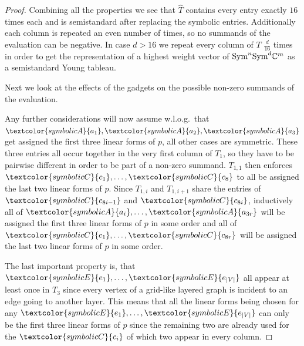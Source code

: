 \documentclass[10pt,a4paper]{article}
\numberwithin{equation}{section}
\theoremstyle{definition}
\newcommand{\Sym}{\textup{Sym}}
\newcommand{\IC}{\mathbb{C}}
\begin{document}
\begin{proof}
    Combining all the properties we see that $\hat{T}$ contains every entry exactly $16$ times each and is semistandard after replacing the symbolic entries.
    Additionally each column is repeated an even number of times, so no summands of the evaluation can be negative.
    In case $d > 16$ we repeat every column of $T$ $\frac{d}{16}$ times in order to get the representation of a highest weight vector of $\Sym^n\Sym^d \IC^m$ as a semistandard Young tableau.
    
    Next we look at the effects of the gadgets on the possible non-zero summands of the evaluation.
    
    Any further considerations will now assume w.l.o.g.\ that $\textcolor{symbolicA}{a_1}, \textcolor{symbolicA}{a_2}, \textcolor{symbolicA}{a_3}$ get assigned the first three linear forms of $p$, all other cases are symmetric.
    These three entries all occur together in the very first column of $T_1$, so they have to be pairwise different in order to be part of a non-zero summand.
    $T_{1,1}$ then enforces $\textcolor{symbolicC}{c_1}, \ldots, \textcolor{symbolicC}{c_8}$ to all be assigned the last two linear forms of $p$.
    Since $T_{1, i}$ and $T_{1, i+1}$ share the entries of $\textcolor{symbolicC}{c_{8i-1}}$ and $\textcolor{symbolicC}{c_{8i}}$, inductively all of $\textcolor{symbolicA}{a_i}, \ldots, \textcolor{symbolicA}{a_{3r}}$ will be assigned the first three linear forms of $p$ in some order and all of $\textcolor{symbolicC}{c_1}, \ldots, \textcolor{symbolicC}{c_{8r}}$ will be assigned the last two linear forms of $p$ in some order.

    The last important property is, that $\textcolor{symbolicE}{e_1}, \ldots, \textcolor{symbolicE}{e_{|V|}}$ all appear at least once in $T_3$ since every vertex of a grid-like layered graph is incident to an edge going to another layer.
    This means that all the linear forms being chosen for any $\textcolor{symbolicE}{e_1}, \ldots, \textcolor{symbolicE}{e_{|V|}}$ can only be the first three linear forms of $p$ since the remaining two are already used for the $\textcolor{symbolicC}{c_i}$ of which two appear in every column.


\end{proof}
\end{document}
